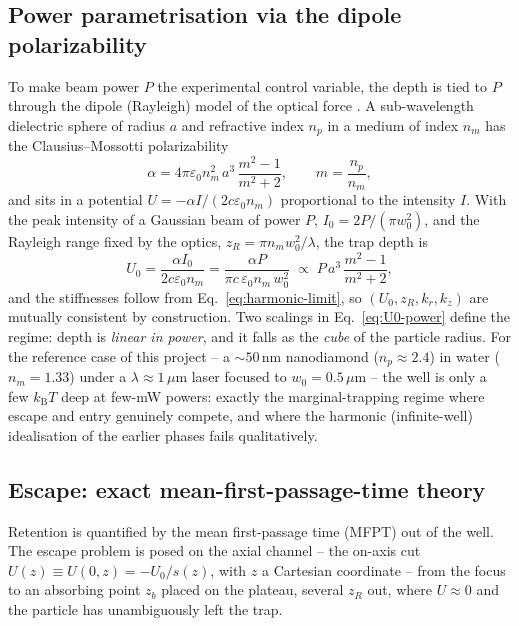 \documentclass[11pt]{article}
\newcommand{\kB}{k_{\mathrm{B}}}
\begin{document}
\subsection{Power parametrisation via the dipole polarizability}
\label{sec:power}

To make beam power $P$ the experimental control variable, the depth is tied to $P$ through the dipole (Rayleigh) model of the optical force \cite{JonesMaragoVolpe2015}. A sub-wavelength dielectric sphere of radius $a$ and refractive index $n_p$ in a medium of index $n_m$ has the Clausius--Mossotti polarizability
\begin{equation}
\alpha = 4\pi\varepsilon_0 n_m^2\, a^3\,\frac{m^2-1}{m^2+2},
\qquad m = \frac{n_p}{n_m},
\label{eq:polarizability}
\end{equation}
and sits in a potential $U = -\alpha I/(2c\varepsilon_0 n_m)$ proportional to the intensity $I$. With the peak intensity of a Gaussian beam of power $P$, $I_0 = 2P/(\pi w_0^2)$, and the Rayleigh range fixed by the optics, $z_R = \pi n_m w_0^2/\lambda$, the trap depth is
\begin{equation}
U_0 = \frac{\alpha I_0}{2c\varepsilon_0 n_m} = \frac{\alpha P}{\pi c\,\varepsilon_0 n_m\, w_0^2}
\;\propto\; P\,a^3\,\frac{m^2-1}{m^2+2},
\label{eq:U0-power}
\end{equation}
and the stiffnesses follow from Eq.~\eqref{eq:harmonic-limit}, so $(U_0, z_R, k_r, k_z)$ are mutually consistent by construction. Two scalings in Eq.~\eqref{eq:U0-power} define the regime: depth is \emph{linear in power}, and it falls as the \emph{cube} of the particle radius. For the reference case of this project -- a $\sim 50\,\mathrm{nm}$ nanodiamond ($n_p \approx 2.4$) in water ($n_m = 1.33$) under a $\lambda \approx 1\,\mu\mathrm{m}$ laser focused to $w_0 = 0.5\,\mu\mathrm{m}$ -- the well is only a few $\kB T$ deep at few-mW powers: exactly the marginal-trapping regime where escape and entry genuinely compete, and where the harmonic (infinite-well) idealisation of the earlier phases fails qualitatively.

\subsection{Escape: exact mean-first-passage-time theory}
\label{sec:mfpt}

Retention is quantified by the mean first-passage time (MFPT) out of the well. The escape problem is posed on the axial channel -- the on-axis cut $U(z) \equiv U(0,z) = -U_0/s(z)$, with $z$ a Cartesian coordinate -- from the focus to an absorbing point $z_b$ placed on the plateau, several $z_R$ out, where $U \approx 0$ and the particle has unambiguously left the trap.
\end{document}
